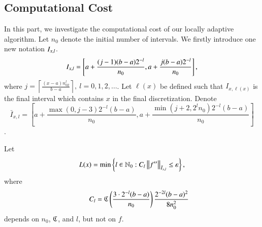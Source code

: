 \subsection{Computational Cost}

In this part, we investigate the computational cost of our locally adaptive algorithm. Let $n_0$ denote the initial number of intervals. We firstly introduce one new notation $\Ixl$.
\[\Ixl=\left[a+\frac{(j-1)(b-a)2^{-l}}{n_0},a+\frac{j(b-a)2^{-l}}{n_0}\right],\]
where $j=\left\lceil\frac{(x-a)n_02^l}{b-a}\right\rceil, \ l = 0,1,2,\ldots$.
Let
$\ell(x)$ be defined such that
$I_{x,\ell(x)}$ is the final interval which contains $x$ in the final discretization.
Denote
\[\bar{I}_{x,l}=\left[a+\frac{\max(0,j-3)2^{-l}(b-a)}{n_0}, a+ \frac{\min(j+2,2^ln_0)2^{-l}(b-a)}{n_0}\right]
\].

Let
\begin{equation}\label{eqn:defoflx}
L(x) = \min \left\{ l \in \natzero : C_l  \norm[\bar{I}_{x,l}]{f''} \le \varepsilon\right\},
\end{equation}
where
\[\qquad C_l=\fC\left(\frac{3\cdot2^{-l}(b-a)}{n_0}\right) \frac{2^{-2l}(b-a)^2}{8n^2_0}
\]
depends on $n_0$, $\fC$, and $l$, but not on $f$.

